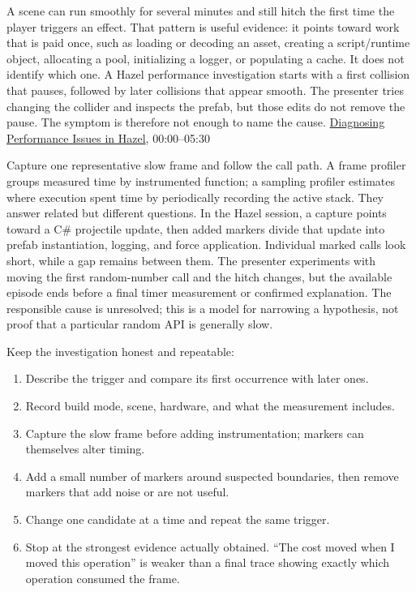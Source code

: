 A scene can run smoothly for several minutes and still hitch the first time the player triggers an effect. That pattern is useful evidence: it points toward work that is paid once, such as loading or decoding an asset, creating a script/runtime object, allocating a pool, initializing a logger, or populating a cache. It does not identify which one. A Hazel performance investigation starts with a first collision that pauses, followed by later collisions that appear smooth. The presenter tries changing the collider and inspects the prefab, but those edits do not remove the pause. The symptom is therefore not enough to name the cause. \href{https://www.youtube.com/watch?v=iY6QbL_3L2I}{Diagnosing Performance Issues in Hazel}, 00:00--05:30

Capture one representative slow frame and follow the call path. A frame profiler groups measured time by instrumented function; a sampling profiler estimates where execution spent time by periodically recording the active stack. They answer related but different questions. In the Hazel session, a capture points toward a C\# projectile update, then added markers divide that update into prefab instantiation, logging, and force application. Individual marked calls look short, while a gap remains between them. The presenter experiments with moving the first random-number call and the hitch changes, but the available episode ends before a final timer measurement or confirmed explanation. The responsible cause is unresolved; this is a model for narrowing a hypothesis, not proof that a particular random API is generally slow.

Keep the investigation honest and repeatable:

\begin{enumerate}
\def\labelenumi{\arabic{enumi}.}
\tightlist
\item
  Describe the trigger and compare its first occurrence with later ones.
\item
  Record build mode, scene, hardware, and what the measurement includes.
\item
  Capture the slow frame before adding instrumentation; markers can themselves alter timing.
\item
  Add a small number of markers around suspected boundaries, then remove markers that add noise or are not useful.
\item
  Change one candidate at a time and repeat the same trigger.
\item
  Stop at the strongest evidence actually obtained. ``The cost moved when I moved this operation'' is weaker than a final trace showing exactly which operation consumed the frame.
\end{enumerate}

